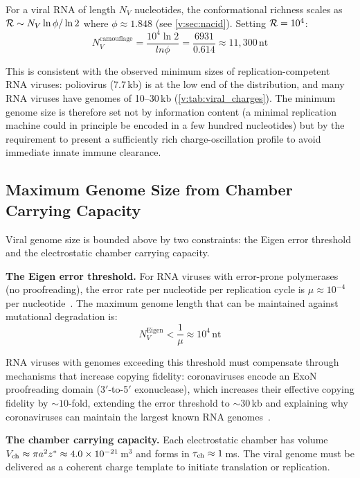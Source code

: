 For a viral RNA of length $N_V$ nucleotides, the conformational richness scales as $\mathcal{R} \sim N_V \ln\phi / \ln 2$ where $\phi \approx 1.848$ (see \cref{v:sec:nacid}). Setting $\mathcal{R} = 10^4$:
\begin{equation}
  N_V^{\mathrm{camouflage}} = \frac{10^4 \ln 2}{ln\phi} = \frac{6931}{0.614} \approx 11,300\,\mathrm{nt}
  \label{v:eq:Ncamouflage}
\end{equation}

This is consistent with the observed minimum sizes of replication-competent RNA viruses: poliovirus (7.7\,kb) is at the low end of the distribution, and many RNA viruses have genomes of 10--30\,kb (\cref{v:tab:viral_charges}). The minimum genome size is therefore set not by information content (a minimal replication machine could in principle be encoded in a few hundred nucleotides) but by the requirement to present a sufficiently rich charge-oscillation profile to avoid immediate innate immune clearance.

\subsection{Maximum Genome Size from Chamber Carrying Capacity}

Viral genome size is bounded above by two constraints: the Eigen error threshold and the electrostatic chamber carrying capacity.

\textbf{The Eigen error threshold.}
For RNA viruses with error-prone polymerases (no proofreading), the error rate per nucleotide per replication cycle is $\mu \approx 10^{-4}$ per nucleotide~\cite{Drake1998,Eigen1971}. The maximum genome length that can be maintained against mutational degradation is:
\begin{equation}
  N_V^{\mathrm{Eigen}} < \frac{1}{\mu} \approx 10^4\,\mathrm{nt}
  \label{v:eq:eigen_threshold}
\end{equation}

RNA viruses with genomes exceeding this threshold must compensate through mechanisms that increase copying fidelity: coronaviruses encode an ExoN proofreading domain (3$'$-to-5$'$ exonuclease), which increases their effective copying fidelity by $\sim\!10$-fold, extending the error threshold to $\sim\!30$\,kb and explaining why coronaviruses can maintain the largest known RNA genomes~\cite{Denison2011,Eckerle2010}.

\textbf{The chamber carrying capacity.}
Each electrostatic chamber has volume $V_{\mathrm{ch}} \approx \pi a^2 z^{*} \approx 4.0 \times 10^{-21}$\,m$^3$ and forms in $\tau_{\mathrm{ch}} \approx 1$\,ms. The viral genome must be delivered as a coherent charge template to initiate translation or replication.

